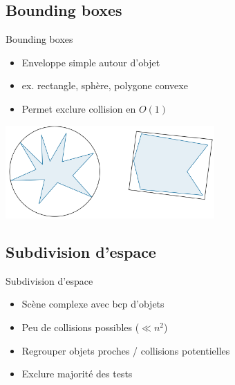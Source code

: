 \documentclass{beamer}
\begin{document}
\subsection{Bounding boxes}

\begin{frame}{Bounding boxes}
	\begin{itemize}
	\item Enveloppe simple autour d'objet
	\item ex. rectangle, sphère, polygone convexe
	\item Permet exclure collision en $O(1)$
	\end{itemize}
	\includegraphics[width=8cm]{bounding.png}
\end{frame}

\subsection{Subdivision d'espace}

\begin{frame}{Subdivision d'espace}
	\begin{itemize}
	\item Scène complexe avec bcp d'objets
	\item Peu de collisions possibles ($\ll n^{2}$)
	\item Regrouper objets proches / collisions potentielles
	\item Exclure majorité des tests
	\end{itemize}
\end{frame}
\end{document}
